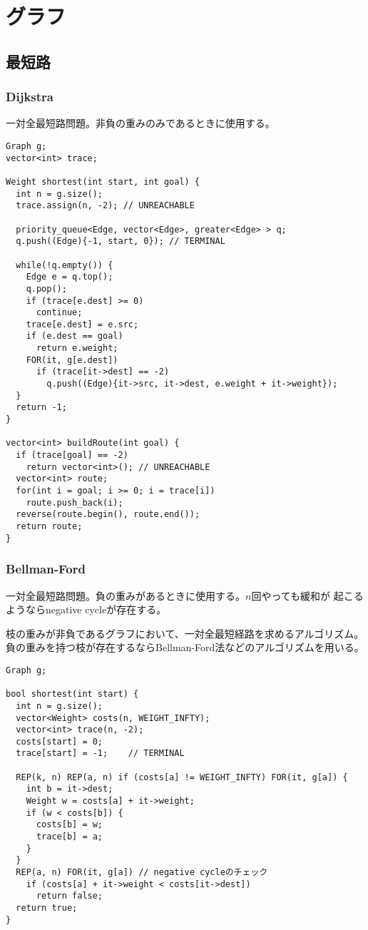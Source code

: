 \section{グラフ}


\subsection{最短路}

\subsubsection{Dijkstra}

一対全最短路問題。非負の重みのみであるときに使用する。

\begin{lstlisting}
Graph g;
vector<int> trace;
 
Weight shortest(int start, int goal) {
  int n = g.size();
  trace.assign(n, -2); // UNREACHABLE
 
  priority_queue<Edge, vector<Edge>, greater<Edge> > q;
  q.push((Edge){-1, start, 0}); // TERMINAL
 
  while(!q.empty()) {
    Edge e = q.top();
    q.pop();
    if (trace[e.dest] >= 0)
      continue;
    trace[e.dest] = e.src;
    if (e.dest == goal)
      return e.weight;
    FOR(it, g[e.dest])
      if (trace[it->dest] == -2)
        q.push((Edge){it->src, it->dest, e.weight + it->weight});
  }
  return -1;
}
 
vector<int> buildRoute(int goal) {
  if (trace[goal] == -2)
    return vector<int>(); // UNREACHABLE
  vector<int> route;
  for(int i = goal; i >= 0; i = trace[i])
    route.push_back(i);
  reverse(route.begin(), route.end());
  return route;
}
\end{lstlisting}

\subsubsection{Bellman-Ford}

一対全最短路問題。負の重みがあるときに使用する。$n$回やっても緩和が
起こるようならnegative cycleが存在する。

枝の重みが非負であるグラフにおいて、一対全最短経路を求めるアルゴリズム。
負の重みを持つ枝が存在するならBellman-Ford法などのアルゴリズムを用いる。

\begin{lstlisting}
Graph g;
 
bool shortest(int start) {
  int n = g.size();
  vector<Weight> costs(n, WEIGHT_INFTY);
  vector<int> trace(n, -2);
  costs[start] = 0;
  trace[start] = -1;    // TERMINAL
 
  REP(k, n) REP(a, n) if (costs[a] != WEIGHT_INFTY) FOR(it, g[a]) {
    int b = it->dest;
    Weight w = costs[a] + it->weight;
    if (w < costs[b]) {
      costs[b] = w;
      trace[b] = a;
    }
  }
  REP(a, n) FOR(it, g[a]) // negative cycleのチェック
    if (costs[a] + it->weight < costs[it->dest])
      return false;
  return true;
}
\end{lstlisting}

